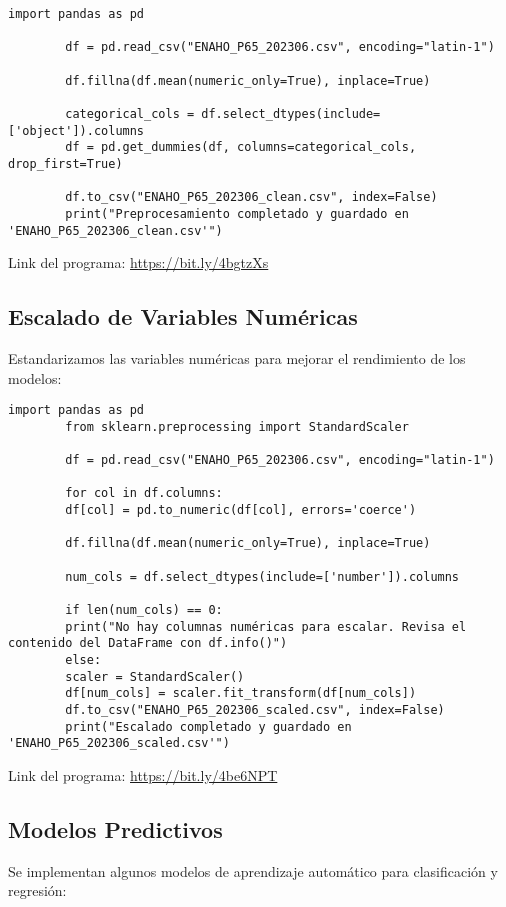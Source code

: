 \documentclass{book}
\begin{document}
	\begin{lstlisting}[caption=Codificaci\'on de Variables Categ\'oricas]
		import pandas as pd
		
		df = pd.read_csv("ENAHO_P65_202306.csv", encoding="latin-1")
		
		df.fillna(df.mean(numeric_only=True), inplace=True)
		
		categorical_cols = df.select_dtypes(include=['object']).columns
		df = pd.get_dummies(df, columns=categorical_cols, drop_first=True)
		
		df.to_csv("ENAHO_P65_202306_clean.csv", index=False)
		print("Preprocesamiento completado y guardado en 'ENAHO_P65_202306_clean.csv'")
	\end{lstlisting}
	Link del programa: \href{https://bit.ly/4bgtzXs}{https://bit.ly/4bgtzXs}
	
	\subsection{Escalado de Variables Num\'ericas}
	Estandarizamos las variables num\'ericas para mejorar el rendimiento de los modelos:
	
	\begin{lstlisting}[caption=Escalado de Variables Num\'ericas]
		import pandas as pd
		from sklearn.preprocessing import StandardScaler
		
		df = pd.read_csv("ENAHO_P65_202306.csv", encoding="latin-1")
		
		for col in df.columns:
		df[col] = pd.to_numeric(df[col], errors='coerce')
		
		df.fillna(df.mean(numeric_only=True), inplace=True)
		
		num_cols = df.select_dtypes(include=['number']).columns
		
		if len(num_cols) == 0:
		print("No hay columnas numéricas para escalar. Revisa el contenido del DataFrame con df.info()")
		else:
		scaler = StandardScaler()
		df[num_cols] = scaler.fit_transform(df[num_cols])
		df.to_csv("ENAHO_P65_202306_scaled.csv", index=False)
		print("Escalado completado y guardado en 'ENAHO_P65_202306_scaled.csv'")
	\end{lstlisting}
	Link del programa: \href{https://bit.ly/4be6NPT}{https://bit.ly/4be6NPT}
	
	\subsection{Modelos Predictivos}
	Se implementan algunos modelos de aprendizaje autom\'atico para clasificaci\'on y regresi\'on:
	
\end{document}

